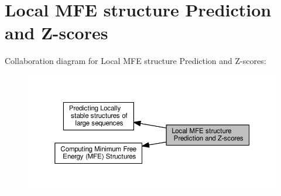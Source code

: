 \hypertarget{group__local__mfe__fold}{}\section{Local M\+FE structure Prediction and Z-\/scores}
\label{group__local__mfe__fold}
Collaboration diagram for Local M\+FE structure Prediction and Z-\/scores\+:
\nopagebreak
\begin{figure}[H]
\begin{center}
\leavevmode
\includegraphics[width=350pt]{group__local__mfe__fold}
\end{center}
\end{figure}
